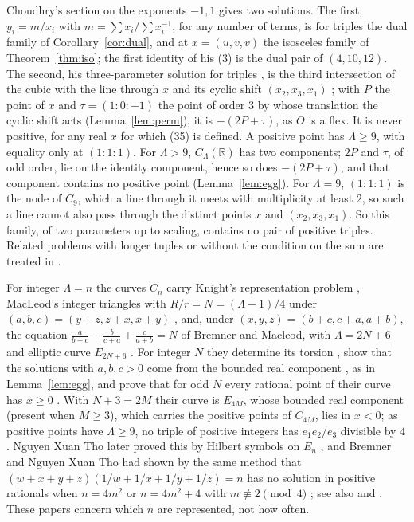 \documentclass[11pt]{amsart}
\theoremstyle{definition}
\theoremstyle{remark}
\newcommand{\R}{\mathbb{R}}
\begin{document}
Choudhry's section on the exponents $-1,1$ \cite[\S4.1]{choudhry2011} gives two solutions. The first, $y_i=m/x_i$ with $m=\sum x_i/\sum x_i^{-1}$, for any number of terms, is for triples the dual family of Corollary~\ref{cor:dual}, and at $x=(u,v,v)$ the isosceles family of Theorem~\ref{thm:iso}; the first identity of his (3) is the dual pair of $(4,10,12)$. The second, his three-parameter solution for triples \cite[(35)]{choudhry2011}, is the third intersection of the cubic with the line through $x$ and its cyclic shift $(x_2,x_3,x_1)$ \cite[(34)]{choudhry2011}; with $P$ the point of $x$ and $\tau=(1:0:-1)$ the point of order $3$ by whose translation the cyclic shift acts (Lemma~\ref{lem:perm}), it is $-(2P+\tau)$, as $O$ is a flex. It is never positive, for any real $x$ for which (35) is defined. A positive point has $\Lambda\ge9$, with equality only at $(1:1:1)$. For $\Lambda>9$, $C_\Lambda(\R)$ has two components; $2P$ and $\tau$, of odd order, lie on the identity component, hence so does $-(2P+\tau)$, and that component contains no positive point (Lemma~\ref{lem:egg}). For $\Lambda=9$, $(1:1:1)$ is the node of $C_9$, which a line through it meets with multiplicity at least $2$, so such a line cannot also pass through the distinct points $x$ and $(x_2,x_3,x_1)$. So this family, of two parameters up to scaling, contains no pair of positive triples. Related problems with longer tuples or without the condition on the sum are treated in \cite{ulas2013,graham1963,vandoorn2025,browningelsholtz2011,elsholtztao2013}.

For integer $\Lambda=n$ the curves $C_n$ carry Knight's representation problem \cite{bgn1993}, MacLeod's integer triangles with $R/r=N=(\Lambda-1)/4$ under $(a,b,c)=(y+z,z+x,x+y)$ \cite{macleod2005}, and, under $(x,y,z)=(b+c,c+a,a+b)$, the equation $\frac a{b+c}+\frac b{c+a}+\frac c{a+b}=N$ of Bremner and Macleod, with $\Lambda=2N+6$ and elliptic curve $E_{2N+6}$ \cite{bremnermacleod2014}. For integer $N$ they determine its torsion \cite[Lemma~2.1]{bremnermacleod2014}, show that the solutions with $a,b,c>0$ come from the bounded real component \cite[\S4]{bremnermacleod2014}, as in Lemma~\ref{lem:egg}, and prove that for odd $N$ every rational point of their curve has $x\ge0$ \cite[Thm~5.1, Cor.~5.2]{bremnermacleod2014}. With $N+3=2M$ their curve is $E_{4M}$, whose bounded real component (present when $M\ge3$), which carries the positive points of $C_{4M}$, lies in $x<0$; as positive points have $\Lambda\ge9$, no triple of positive integers has $e_1e_2/e_3$ divisible by $4$. Nguyen Xuan Tho later proved this by Hilbert symbols on $E_n$ \cite[Theorem~1.1]{tho2021}, and Bremner and Nguyen Xuan Tho had shown by the same method that $(w+x+y+z)(1/w+1/x+1/y+1/z)=n$ has no solution in positive rationals when $n=4m^2$ or $n=4m^2+4$ with $m\not\equiv2\pmod 4$ \cite[Theorems~8, 9, and~14]{bremnertho2018}; see also \cite[p.~130]{bgn1993} and \cite{zhang2016}. These papers concern which $n$ are represented, not how often.
\end{document}
